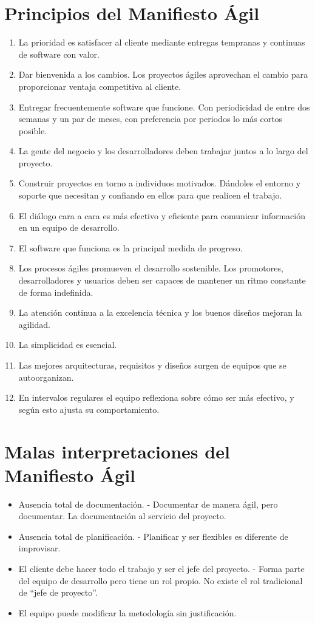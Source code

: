 \documentclass[12pt,twoside,titlepage]{report}
\begin{document}
\section{Principios del Manifiesto Ágil}
\begin{enumerate}
    \item La prioridad es satisfacer al cliente mediante entregas tempranas y continuas de software con valor.
    \item Dar bienvenida a los cambios. Los proyectos ágiles aprovechan el cambio para proporcionar ventaja competitiva al cliente.
    \item Entregar frecuentemente software que funcione. Con periodicidad de entre dos semanas y un par de meses, con preferencia por periodos lo más cortos posible.
    \item La gente del negocio y los desarrolladores deben trabajar juntos a lo largo del proyecto.
    \item Construir proyectos en torno a individuos motivados. Dándoles el entorno y soporte que necesitan y confiando en ellos para que realicen el trabajo.
    \item El diálogo cara a cara es más efectivo y eficiente para comunicar información en un equipo de desarrollo.
    \item El software que funciona es la principal medida de progreso.
    \item Los procesos ágiles promueven el desarrollo sostenible. Los promotores, desarrolladores y usuarios deben ser capaces de mantener un ritmo constante de forma indefinida.
    \item La atención continua a la excelencia técnica y los buenos diseños mejoran la agilidad.
    \item La simplicidad es esencial.
    \item Las mejores arquitecturas, requisitos y diseños surgen de equipos que se autoorganizan.
    \item En intervalos regulares el equipo reflexiona sobre cómo ser más efectivo, y según esto ajusta su comportamiento.
\end{enumerate}

\section{Malas interpretaciones del Manifiesto Ágil}
\begin{itemize}
    \item Ausencia total de documentación.
    - Documentar de manera ágil, pero documentar. La documentación al servicio del proyecto.
    \item Ausencia total de planificación.
    - Planificar y ser flexibles es diferente de improvisar.
    \item El cliente debe hacer todo el trabajo y ser el jefe del proyecto.
    - Forma parte del equipo de desarrollo pero tiene un rol propio. No existe el rol tradicional de “jefe de proyecto”.
    \item El equipo puede modificar la metodología sin justificación.
\end{itemize}




\end{document}
